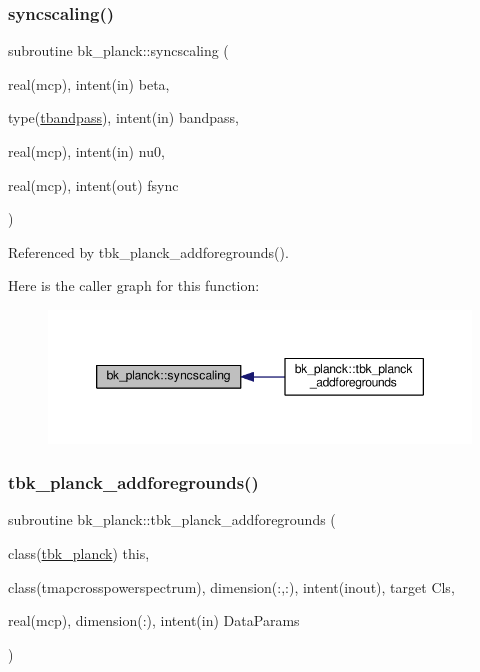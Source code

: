 \subsubsection{\texorpdfstring{syncscaling()}{syncscaling()}}
{\footnotesize\ttfamily subroutine bk\+\_\+planck\+::syncscaling (\begin{DoxyParamCaption}\item[{real(mcp), intent(in)}]{beta,  }\item[{type(\mbox{\hyperlink{structbk__planck_1_1tbandpass}{tbandpass}}), intent(in)}]{bandpass,  }\item[{real(mcp), intent(in)}]{nu0,  }\item[{real(mcp), intent(out)}]{fsync }\end{DoxyParamCaption})\hspace{0.3cm}{\ttfamily [private]}}



Referenced by tbk\+\_\+planck\+\_\+addforegrounds().

Here is the caller graph for this function\+:
\nopagebreak
\begin{figure}[H]
\begin{center}
\leavevmode
\includegraphics[width=350pt]{namespacebk__planck_ae4ec8dfb07864a47b4f431f0be309608_icgraph}
\end{center}
\end{figure}
\mbox{\label{namespacebk__planck_af94e4192bd2f4c8746e6e1108e87a0f0}} 
\subsubsection{\texorpdfstring{tbk\+\_\+planck\+\_\+addforegrounds()}{tbk\_planck\_addforegrounds()}}
{\footnotesize\ttfamily subroutine bk\+\_\+planck\+::tbk\+\_\+planck\+\_\+addforegrounds (\begin{DoxyParamCaption}\item[{class(\mbox{\hyperlink{structbk__planck_1_1tbk__planck}{tbk\+\_\+planck}})}]{this,  }\item[{class(tmapcrosspowerspectrum), dimension(\+:,\+:), intent(inout), target}]{Cls,  }\item[{real(mcp), dimension(\+:), intent(in)}]{Data\+Params }\end{DoxyParamCaption})\hspace{0.3cm}{\ttfamily [private]}}



